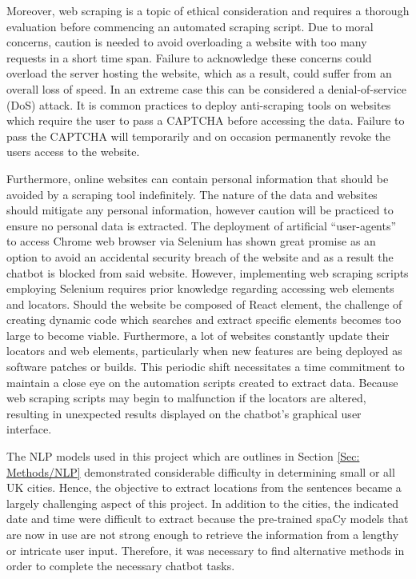 \noindent
Moreover, web scraping is a topic of ethical consideration and requires a thorough evaluation before commencing an automated scraping script. Due to moral concerns, caution is needed to avoid overloading a website with too many requests in a short time span. Failure to acknowledge these concerns could overload the server hosting the website, which as a result, could suffer from an overall loss of speed. In an extreme case this can be considered a denial-of-service (DoS) attack. It is common practices to deploy anti-scraping tools on websites which require the user to pass a CAPTCHA before accessing the data. Failure to pass the CAPTCHA will temporarily and on occasion permanently revoke the users access to the website.\vspace{0.5cm}

\noindent
Furthermore, online websites can contain personal information that should be avoided by a scraping tool indefinitely. The nature of the data and websites should mitigate any personal information, however caution will be practiced to ensure no personal data is extracted. The deployment of artificial ``user-agents'' to access Chrome web browser via Selenium has shown great promise as an option to avoid an accidental security breach of the website and as a result the chatbot is blocked from said website. However, implementing web scraping scripts employing Selenium requires prior knowledge regarding accessing web elements and locators. Should the website be composed of React element, the challenge of creating dynamic code which searches and extract specific elements becomes too large to become viable. Furthermore, a lot of websites constantly update their locators and web elements, particularly when new features are being deployed as software patches or builds. This periodic shift necessitates a time commitment to maintain a close eye on the automation scripts created to extract data. Because web scraping scripts may begin to malfunction if the locators are altered, resulting in unexpected results displayed on the chatbot's graphical user interface.
 \vspace{0.5cm}

\noindent
The NLP models used in this project which are outlines in Section \ref{Sec: Methods/NLP} demonstrated considerable difficulty in determining small or all UK cities. Hence, the objective to extract locations from the sentences became a largely challenging aspect of this project. In addition to the cities, the indicated date and time were difficult to extract because the pre-trained spaCy models that are now in use are not strong enough to retrieve the information from a lengthy or intricate user input. Therefore, it was necessary to find alternative methods in order to complete the necessary chatbot tasks. \vspace{0.5cm}


